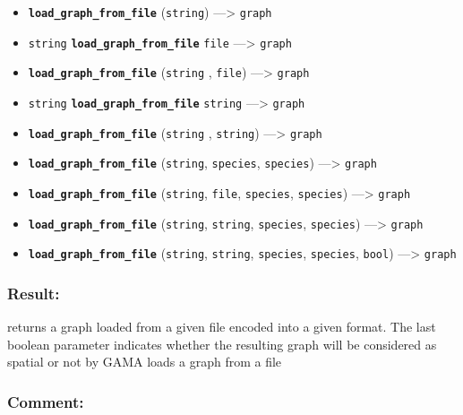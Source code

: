 \documentclass[]{book}
\providecommand{\tightlist}{%
  \setlength{\itemsep}{0pt}\setlength{\parskip}{0pt}}
\theoremstyle{definition}
\theoremstyle{definition}
\theoremstyle{definition}
\theoremstyle{remark}
\begin{document}
\begin{itemize}
\tightlist
\item
  \textbf{\texttt{load\_graph\_from\_file}} (\texttt{string})
  ---\textgreater{} \texttt{graph}
\item
  \texttt{string} \textbf{\texttt{load\_graph\_from\_file}}
  \texttt{file} ---\textgreater{} \texttt{graph}
\item
  \textbf{\texttt{load\_graph\_from\_file}} (\texttt{string} ,
  \texttt{file}) ---\textgreater{} \texttt{graph}
\item
  \texttt{string} \textbf{\texttt{load\_graph\_from\_file}}
  \texttt{string} ---\textgreater{} \texttt{graph}
\item
  \textbf{\texttt{load\_graph\_from\_file}} (\texttt{string} ,
  \texttt{string}) ---\textgreater{} \texttt{graph}
\item
  \textbf{\texttt{load\_graph\_from\_file}} (\texttt{string},
  \texttt{species}, \texttt{species}) ---\textgreater{} \texttt{graph}
\item
  \textbf{\texttt{load\_graph\_from\_file}} (\texttt{string},
  \texttt{file}, \texttt{species}, \texttt{species}) ---\textgreater{}
  \texttt{graph}
\item
  \textbf{\texttt{load\_graph\_from\_file}} (\texttt{string},
  \texttt{string}, \texttt{species}, \texttt{species}) ---\textgreater{}
  \texttt{graph}
\item
  \textbf{\texttt{load\_graph\_from\_file}} (\texttt{string},
  \texttt{string}, \texttt{species}, \texttt{species}, \texttt{bool})
  ---\textgreater{} \texttt{graph}
\end{itemize}

\subsubsection{Result:}\label{result-316}

returns a graph loaded from a given file encoded into a given format.
The last boolean parameter indicates whether the resulting graph will be
considered as spatial or not by GAMA loads a graph from a file

\subsubsection{Comment:}\label{comment-62}
\end{document}
